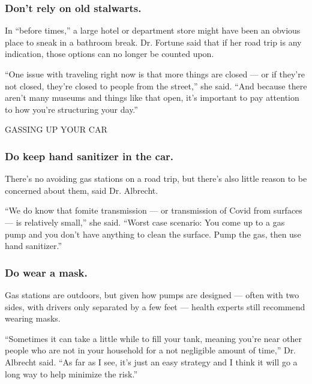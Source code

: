 \hypertarget{dont-rely-on-old-stalwarts}{%
\subsubsection{Don't rely on old
stalwarts.}\label{dont-rely-on-old-stalwarts}}

In ``before times,'' a large hotel or department store might have been
an obvious place to sneak in a bathroom break. Dr. Fortune said that if
her road trip is any indication, those options can no longer be counted
upon.

``One issue with traveling right now is that more things are closed ---
or if they're not closed, they're closed to people from the street,''
she said. ``And because there aren't many museums and things like that
open, it's important to pay attention to how you're structuring your
day.''

GASSING UP YOUR CAR

\hypertarget{do-keep-hand-sanitizer-in-the-car}{%
\subsubsection{\texorpdfstring{\textbf{Do keep hand sanitizer in the
car.}}{Do keep hand sanitizer in the car.}}\label{do-keep-hand-sanitizer-in-the-car}}

There's no avoiding gas stations on a road trip, but there's also little
reason to be concerned about them, said Dr. Albrecht.

``We do know that fomite transmission --- or transmission of Covid from
surfaces --- is relatively small,'' she said. ``Worst case scenario: You
come up to a gas pump and you don't have anything to clean the surface.
Pump the gas, then use hand sanitizer.''

\hypertarget{do-wear-a-mask}{%
\subsubsection{\texorpdfstring{\textbf{Do wear a
mask.}}{Do wear a mask.}}\label{do-wear-a-mask}}

Gas stations are outdoors, but given how pumps are designed --- often
with two sides, with drivers only separated by a few feet --- health
experts still recommend wearing masks.

``Sometimes it can take a little while to fill your tank, meaning you're
near other people who are not in your household for a not negligible
amount of time,'' Dr. Albrecht said. ``As far as I see, it's just an
easy strategy and I think it will go a long way to help minimize the
risk.''

